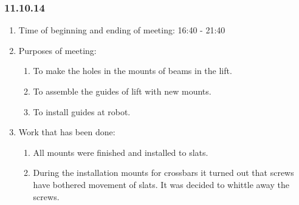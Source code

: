 
\subsubsection{11.10.14}

\begin{enumerate}
	\item Time of beginning and ending of meeting:
	16:40 - 21:40
	\item Purposes of meeting:
	\begin{enumerate}
	  \item To make the holes in the mounts of beams in the lift.
	  
	  \item To assemble the guides of lift with new mounts.
	  
	  \item To install guides at robot.
	  
    \end{enumerate}
	\item Work that has been done:
	\begin{enumerate}
	  \item All mounts were finished and installed to slats.
      
      \item During the installation mounts for crossbars it turned out that screws have bothered movement of slats. It was decided to whittle away the screws.
      

\end{enumerate}
\end{enumerate}
